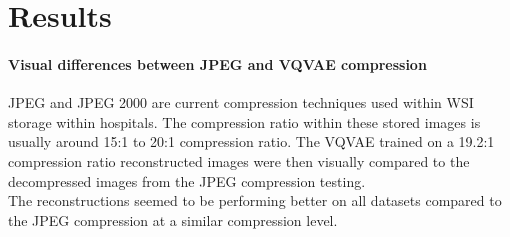 \documentclass[review]{elsarticle}
\begin{document}
    
    

\section{Results}
\paragraph{Visual differences between JPEG and VQVAE compression} JPEG and JPEG 2000 are current compression techniques used within WSI storage within hospitals. The compression ratio within these stored images is usually around 15:1 to 20:1 compression ratio. The VQVAE trained on a 19.2:1 compression ratio reconstructed images were then visually compared to the decompressed images from the JPEG compression testing. \\
The reconstructions seemed to be performing better on all datasets compared to the JPEG compression at a similar compression level.
\end{document}
